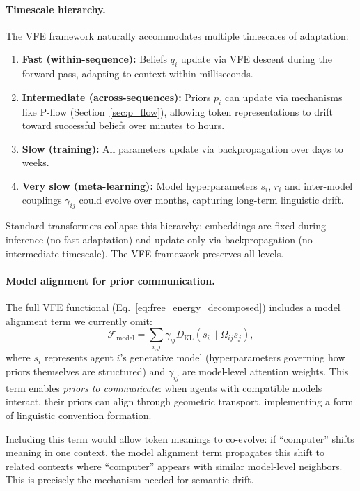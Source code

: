 \documentclass[twoside,11pt]{article}
\begin{document}
\paragraph{Timescale hierarchy.} The VFE framework naturally accommodates multiple timescales of adaptation:
\begin{enumerate}
    \item \textbf{Fast (within-sequence):} Beliefs $q_i$ update via VFE descent during the forward pass, adapting to context within milliseconds.
    \item \textbf{Intermediate (across-sequences):} Priors $p_i$ can update via mechanisms like P-flow (Section~\ref{sec:p_flow}), allowing token representations to drift toward successful beliefs over minutes to hours.
    \item \textbf{Slow (training):} All parameters update via backpropagation over days to weeks.
    \item \textbf{Very slow (meta-learning):} Model hyperparameters $s_i$, $r_i$ and inter-model couplings $\gamma_{ij}$ could evolve over months, capturing long-term linguistic drift.
\end{enumerate}

Standard transformers collapse this hierarchy: embeddings are fixed during inference (no fast adaptation) and update only via backpropagation (no intermediate timescale). The VFE framework preserves all levels.

\paragraph{Model alignment for prior communication.} The full VFE functional (Eq.~\ref{eq:free_energy_decomposed}) includes a model alignment term we currently omit:
%
\begin{equation}
\mathcal{F}_{\text{model}} = \sum_{i,j} \gamma_{ij} D_{\mathrm{KL}}(s_i \| \Omega_{ij} s_j),
\label{eq:model_alignment}
\end{equation}
%
where $s_i$ represents agent $i$'s generative model (hyperparameters governing how priors themselves are structured) and $\gamma_{ij}$ are model-level attention weights. This term enables \emph{priors to communicate}: when agents with compatible models interact, their priors can align through geometric transport, implementing a form of linguistic convention formation.

Including this term would allow token meanings to co-evolve: if ``computer'' shifts meaning in one context, the model alignment term propagates this shift to related contexts where ``computer'' appears with similar model-level neighbors. This is precisely the mechanism needed for semantic drift.
\end{document}
